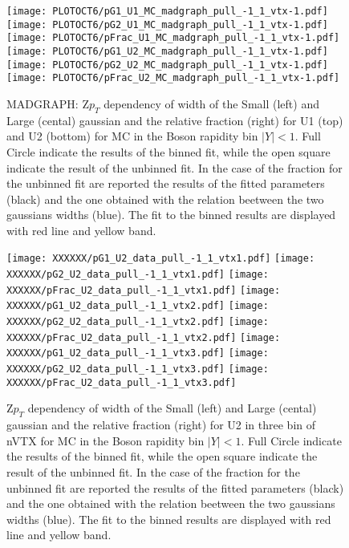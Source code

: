 \documentclass[41pt,a4paper,oneside]{report}
\begin{document}
\begin{figure}[h!]
  \begin{center}
    \texttt{[image: PLOTOCT6/pG1\_U1\_MC\_madgraph\_pull\_-1\_1\_vtx-1.pdf]}
    \texttt{[image: PLOTOCT6/pG2\_U1\_MC\_madgraph\_pull\_-1\_1\_vtx-1.pdf]}
    \texttt{[image: PLOTOCT6/pFrac\_U1\_MC\_madgraph\_pull\_-1\_1\_vtx-1.pdf]} 
    \texttt{[image: PLOTOCT6/pG1\_U2\_MC\_madgraph\_pull\_-1\_1\_vtx-1.pdf]}
    \texttt{[image: PLOTOCT6/pG2\_U2\_MC\_madgraph\_pull\_-1\_1\_vtx-1.pdf]}
    \texttt{[image: PLOTOCT6/pFrac\_U2\_MC\_madgraph\_pull\_-1\_1\_vtx-1.pdf]} 
    \caption{MADGRAPH: Z$p_{T}$ dependency of width of the Small (left) and Large (cental) gaussian and the relative fraction (right) for U1 (top) and U2 (bottom) for MC in the Boson rapidity bin $|Y|<1$. Full Circle indicate the results of the binned fit, while the open square indicate the result of the unbinned fit. In the case of the fraction for the unbinned fit are reported the results of the fitted parameters (black) and the one obtained with the relation beetween the two gaussians widths (blue). The fit to the binned results are displayed with red line and yellow band.}
    \label{fig:SmallLargeMAD}
  \end{center}
  \begin{center}
    \texttt{[image: XXXXXX/pG1\_U2\_data\_pull\_-1\_1\_vtx1.pdf]}
    \texttt{[image: XXXXXX/pG2\_U2\_data\_pull\_-1\_1\_vtx1.pdf]}
    \texttt{[image: XXXXXX/pFrac\_U2\_data\_pull\_-1\_1\_vtx1.pdf]} 
    \texttt{[image: XXXXXX/pG1\_U2\_data\_pull\_-1\_1\_vtx2.pdf]}
    \texttt{[image: XXXXXX/pG2\_U2\_data\_pull\_-1\_1\_vtx2.pdf]}
    \texttt{[image: XXXXXX/pFrac\_U2\_data\_pull\_-1\_1\_vtx2.pdf]} 
    \texttt{[image: XXXXXX/pG1\_U2\_data\_pull\_-1\_1\_vtx3.pdf]}
    \texttt{[image: XXXXXX/pG2\_U2\_data\_pull\_-1\_1\_vtx3.pdf]}
    \texttt{[image: XXXXXX/pFrac\_U2\_data\_pull\_-1\_1\_vtx3.pdf]} 
    \caption{Z$p_{T}$ dependency of width of the Small (left) and Large (cental) gaussian and the relative fraction (right) for U2 in three bin of nVTX for MC in the Boson rapidity bin $|Y|<1$. Full Circle indicate the results of the binned fit, while the open square indicate the result of the unbinned fit. In the case of the fraction for the unbinned fit are reported the results of the fitted parameters (black) and the one obtained with the relation beetween the two gaussians widths (blue). The fit to the binned results are displayed with red line and yellow band. {\color{blue}{plot oder than OCT6}}}
    \label{fig:SmallLargeDATAVTX}
  \end{center}
\end{figure}
\end{document}
